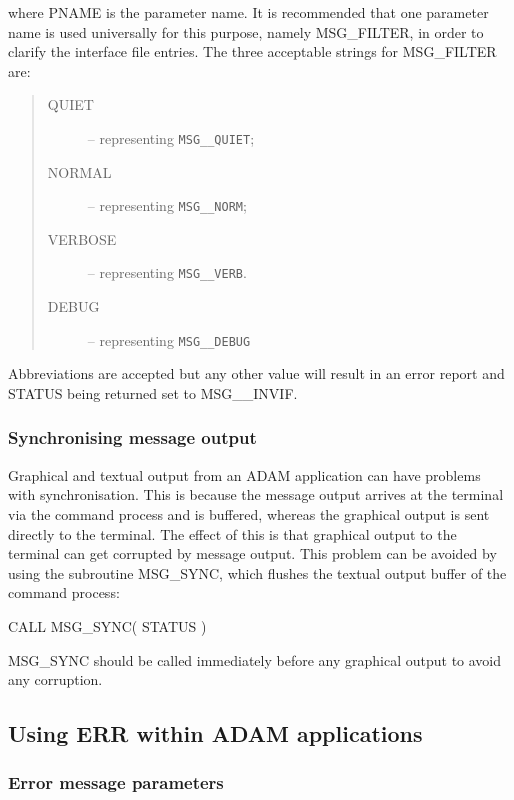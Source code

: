 \documentclass[twoside,11pt]{starlink}
\providecommand{\const}[1]{\texttt{#1}}
\providecommand{\msgnorm}{\const{MSG\_\_NORM}}
\providecommand{\msgverb}{\const{MSG\_\_VERB}}
\providecommand{\msgquiet}{\const{MSG\_\_QUIET}}
\providecommand{\msgdebug}{\const{MSG\_\_DEBUG}}
\begin{document}
where PNAME is the parameter name.
It is recommended that one parameter name is used universally for this purpose,
namely MSG\_FILTER, in order to clarify the interface file entries.
The three acceptable strings for MSG\_FILTER are:

\begin {quote}
\begin {description}
\item [QUIET] -- representing \msgquiet;
\item [NORMAL] -- representing \msgnorm;
\item [VERBOSE] -- representing \msgverb.
\item [DEBUG] -- representing \msgdebug\
\end {description}
\end {quote}
Abbreviations are accepted but
any other value will result in an error report and STATUS being
returned set to MSG\_\_INVIF.


\subsubsection{Synchronising message output}

Graphical and textual output from an ADAM application can have problems with
synchronisation.
This is because the message output arrives at the terminal via the command
process and is buffered, whereas the graphical output is sent directly to the
terminal.
The effect of this is that graphical output to the terminal can get corrupted by
message output.
This problem can be avoided by using the subroutine MSG\_SYNC, which flushes
the textual output buffer of the command process:

\begin {small}
\begin{terminalv}
CALL MSG_SYNC( STATUS )
\end{terminalv}
\end {small}

MSG\_SYNC should be called immediately before any graphical output to avoid any
corruption.


\subsection{Using ERR within ADAM applications \label{adam_err}}

\subsubsection{Error message parameters}
\end{document}
